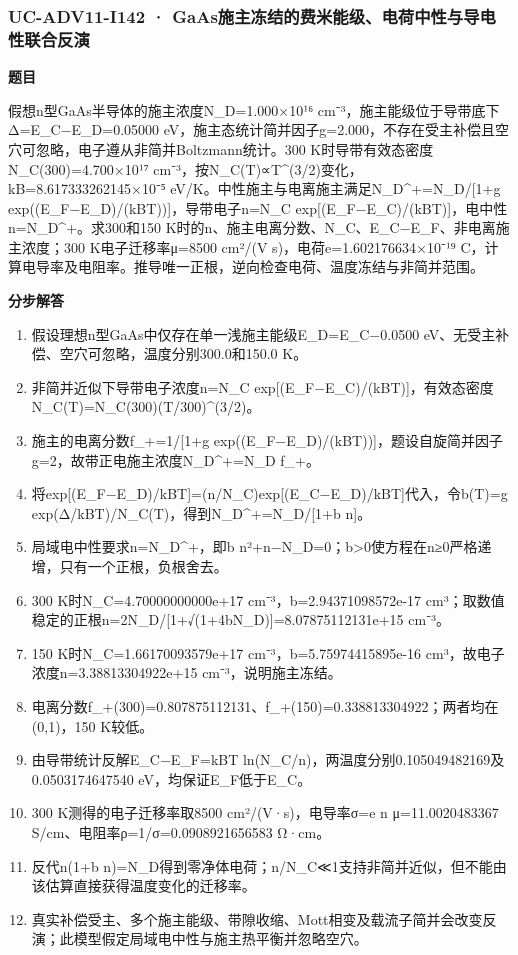 \documentclass[UTF8,11pt,a4paper]{ctexart}
\begin{document}
\subsubsection*{UC-ADV11-I142 · GaAs施主冻结的费米能级、电荷中性与导电性联合反演}
\noindent\textbf{题目}\par
假想n型GaAs半导体的施主浓度N\_D=1.000×10¹⁶ cm⁻³，施主能级位于导带底下Δ=E\_C−E\_D=0.05000 eV，施主态统计简并因子g=2.000，不存在受主补偿且空穴可忽略，电子遵从非简并Boltzmann统计。300 K时导带有效态密度N\_C(300)=4.700×10¹⁷ cm⁻³，按N\_C(T)∝T\textasciicircum{}(3/2)变化，kB=8.617333262145×10⁻⁵ eV/K。中性施主与电离施主满足N\_D\textasciicircum{}+=N\_D/[1+g exp((E\_F−E\_D)/(kBT))]，导带电子n=N\_C exp[(E\_F−E\_C)/(kBT)]，电中性n=N\_D\textasciicircum{}+。求300和150 K时的n、施主电离分数、N\_C、E\_C−E\_F、非电离施主浓度；300 K电子迁移率μ=8500 cm²/(V s)，电荷e=1.602176634×10⁻¹⁹ C，计算电导率及电阻率。推导唯一正根，逆向检查电荷、温度冻结与非简并范围。\par
\medskip\noindent\textbf{分步解答}
\begin{enumerate}
\item 假设理想n型GaAs中仅存在单一浅施主能级E\_D=E\_C−0.0500 eV、无受主补偿、空穴可忽略，温度分别300.0和150.0 K。
\item 非简并近似下导带电子浓度n=N\_C exp[(E\_F−E\_C)/(kBT)]，有效态密度N\_C(T)=N\_C(300)(T/300)\textasciicircum{}(3/2)。
\item 施主的电离分数f\_+=1/[1+g exp((E\_F−E\_D)/(kBT))]，题设自旋简并因子g=2，故带正电施主浓度N\_D\textasciicircum{}+=N\_D f\_+。
\item 将exp[(E\_F−E\_D)/kBT]=(n/N\_C)exp[(E\_C−E\_D)/kBT]代入，令b(T)=g exp(Δ/kBT)/N\_C(T)，得到N\_D\textasciicircum{}+=N\_D/[1+b n]。
\item 局域电中性要求n=N\_D\textasciicircum{}+，即b n²+n−N\_D=0；b>0使方程在n≥0严格递增，只有一个正根，负根舍去。
\item 300 K时N\_C=4.70000000000e+17 cm⁻³，b=2.94371098572e-17 cm³；取数值稳定的正根n=2N\_D/[1+√(1+4bN\_D)]=8.07875112131e+15 cm⁻³。
\item 150 K时N\_C=1.66170093579e+17 cm⁻³，b=5.75974415895e-16 cm³，故电子浓度n=3.38813304922e+15 cm⁻³，说明施主冻结。
\item 电离分数f\_+(300)=0.807875112131、f\_+(150)=0.338813304922；两者均在(0,1)，150 K较低。
\item 由导带统计反解E\_C−E\_F=kBT ln(N\_C/n)，两温度分别0.105049482169及0.0503174647540 eV，均保证E\_F低于E\_C。
\item 300 K测得的电子迁移率取8500 cm²/(V·s)，电导率σ=e n μ=11.0020483367 S/cm、电阻率ρ=1/σ=0.0908921656583 Ω·cm。
\item 反代n(1+b n)=N\_D得到零净体电荷；n/N\_C≪1支持非简并近似，但不能由该估算直接获得温度变化的迁移率。
\item 真实补偿受主、多个施主能级、带隙收缩、Mott相变及载流子简并会改变反演；此模型假定局域电中性与施主热平衡并忽略空穴。
\end{enumerate}
\end{document}
